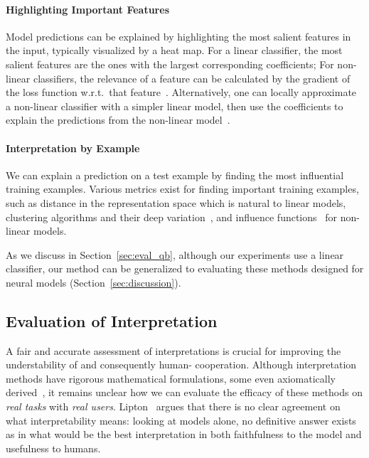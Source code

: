 \paragraph{Highlighting Important Features}
Model predictions can be explained by
highlighting the most salient features in the input, typically visualized
by a heat map.  For a linear classifier, the most salient features
are the ones with the largest corresponding coefficients;  For
non-linear classifiers, the relevance of a feature can be calculated
by the gradient of the loss function w.r.t.\ that
feature~\cite{simonyan2013deep}.
Alternatively, one can locally approximate a non-linear classifier
with a simpler linear model, then use the coefficients to explain the
predictions from the non-linear model~\cite{ribeiro2016lime}.

\paragraph{Interpretation by Example}
We can explain a prediction on a test example by finding the most
influential training examples.  Various metrics exist for finding
important training examples, such as distance in the representation
space which is natural to linear models, clustering algorithms and
their deep variation~\cite{papernot2018dknn}, and influence
functions~\cite{koh2017influence} for non-linear models.

As we discuss in Section~\ref{sec:eval_qb}, although our experiments
use a linear classifier,  our method can be generalized to evaluating
these methods designed for neural models
(Section~\ref{sec:discussion}).

\subsection{Evaluation of Interpretation}

A fair and accurate assessment of interpretations is crucial for
improving the understability of  and consequently
human- cooperation.
Although interpretation methods have rigorous mathematical
formulations, some even axiomatically
derived~\cite{sundararajan2017axiomatic}, it remains unclear how we
can evaluate the efficacy of these methods on \emph{real tasks} with
\emph{real users}. Lipton~\cite{lipton2016mythos} argues that there is no
clear agreement on what interpretability means: looking at 
models alone, no definitive answer exists as in what would be the best
interpretation in both faithfulness to the model and usefulness
to humans.

